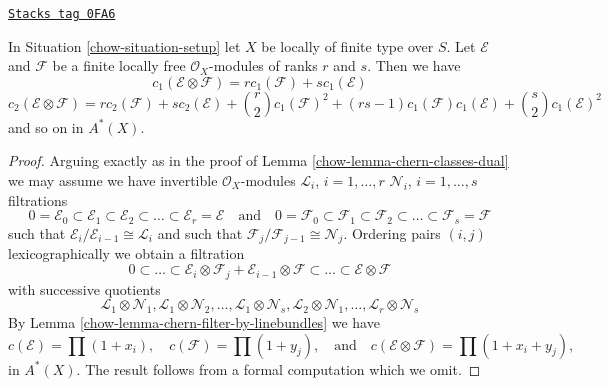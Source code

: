 \begin{lemma}
\label{chow-lemma-chern-classes-tensor-product}
\href{https://stacks.math.columbia.edu/tag/0FA6}{\texttt{Stacks tag 0FA6}}

In Situation \ref{chow-situation-setup} let $X$ be locally of finite type over $S$.
Let $\mathcal{E}$ and $\mathcal{F}$ be a finite locally free
$\mathcal{O}_X$-modules of ranks $r$ and $s$. Then we have
$$
c_1(\mathcal{E} \otimes \mathcal{F})
=
r c_1(\mathcal{F}) + s c_1(\mathcal{E})
$$
$$
c_2(\mathcal{E} \otimes \mathcal{F})
=
r c_2(\mathcal{F}) + s c_2(\mathcal{E}) +
{r \choose 2} c_1(\mathcal{F})^2 +
(rs - 1) c_1(\mathcal{F})c_1(\mathcal{E}) +
{s \choose 2} c_1(\mathcal{E})^2
$$
and so on in $A^*(X)$.
\end{lemma}

\begin{proof}

Arguing exactly as in the proof of Lemma \ref{chow-lemma-chern-classes-dual}
we may assume we have
invertible $\mathcal{O}_X$-modules
${\mathcal L}_i$, $i = 1, \ldots, r$
${\mathcal N}_i$, $i = 1, \ldots, s$
filtrations
$$
0 = \mathcal{E}_0 \subset \mathcal{E}_1 \subset \mathcal{E}_2
\subset \ldots \subset \mathcal{E}_r = \mathcal{E}
\quad\text{and}\quad
0 = \mathcal{F}_0 \subset \mathcal{F}_1 \subset \mathcal{F}_2
\subset \ldots \subset \mathcal{F}_s = \mathcal{F}
$$
such that $\mathcal{E}_i/\mathcal{E}_{i - 1} \cong \mathcal{L}_i$
and such that $\mathcal{F}_j/\mathcal{F}_{j - 1} \cong \mathcal{N}_j$.
Ordering pairs $(i, j)$ lexicographically
we obtain a filtration
$$
0 \subset \ldots \subset
\mathcal{E}_i \otimes \mathcal{F}_j
+
\mathcal{E}_{i - 1} \otimes \mathcal{F}
\subset \ldots \subset \mathcal{E} \otimes \mathcal{F}
$$
with successive quotients
$$
\mathcal{L}_1 \otimes \mathcal{N}_1,
\mathcal{L}_1 \otimes \mathcal{N}_2,
\ldots,
\mathcal{L}_1 \otimes \mathcal{N}_s,
\mathcal{L}_2 \otimes \mathcal{N}_1,
\ldots,
\mathcal{L}_r \otimes \mathcal{N}_s
$$
By Lemma \ref{chow-lemma-chern-filter-by-linebundles}
we have
$$
c(\mathcal{E}) = \prod (1 + x_i),
\quad
c(\mathcal{F}) = \prod (1 + y_j),
\quad\text{and}\quad
c(\mathcal{E} \otimes \mathcal{F}) = \prod (1 + x_i + y_j),
$$
in $A^*(X)$. The result follows from a formal computation
which we omit.
\end{proof}

